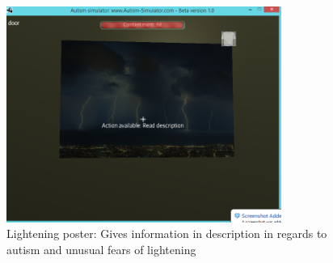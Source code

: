 \begin{figure}[H]
\centering
\includegraphics[width=90mm]{images/implementationfirst/gameimages/lighteningposter.png}
\caption{Lightening poster: Gives information in description in regards to autism and unusual fears of lightening}
\label{old_house}
\end{figure}





